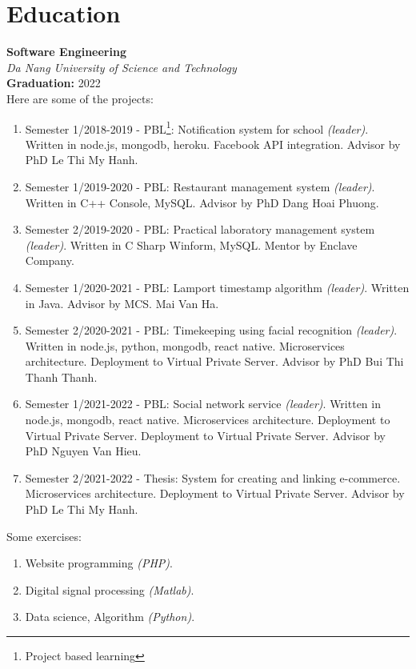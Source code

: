 \documentclass[10pt]{article} %
\begin{document}
\section{Education}
\textbf{Software Engineering} \\
\emph{Da Nang University of Science and Technology} \\
\textbf{Graduation:} 2022
\\
Here are some of the projects:
\begin{enumerate}
  \item Semester 1/2018-2019 - PBL\footnote{Project based learning}: Notification system for school \emph{(leader)}. Written in node.js, mongodb, heroku. Facebook API integration. Advisor by PhD Le Thi My Hanh.
  \item Semester 1/2019-2020 - PBL: Restaurant management system \emph{(leader)}. Written in C++ Console, MySQL. Advisor by PhD Dang Hoai Phuong.
  \item Semester 2/2019-2020 - PBL: Practical laboratory management system \emph{(leader)}. Written in C Sharp Winform, MySQL. Mentor by Enclave Company.
  \item Semester 1/2020-2021 - PBL: Lamport timestamp algorithm \emph{(leader)}. Written in Java. Advisor by MCS. Mai Van Ha.
  \item Semester 2/2020-2021 - PBL: Timekeeping using facial recognition \emph{(leader)}. Written in node.js, python, mongodb, react native. Microservices architecture. Deployment to Virtual Private Server. Advisor by PhD Bui Thi Thanh Thanh.
  \item Semester 1/2021-2022 - PBL: Social network service \emph{(leader)}. Written in node.js, mongodb, react native. Microservices architecture. Deployment to Virtual Private Server. Deployment to Virtual Private Server. Advisor by PhD Nguyen Van Hieu.
  \item Semester 2/2021-2022 - Thesis: System for creating and linking e-commerce. Microservices architecture. Deployment to Virtual Private Server. Advisor by PhD Le Thi My Hanh.
\end{enumerate}
Some exercises:
\begin{enumerate}
  \item Website programming \emph{(PHP)}.
  \item Digital signal processing \emph{(Matlab)}.
  \item Data science, Algorithm \emph{(Python)}.
\end{enumerate}	
\end{document}
